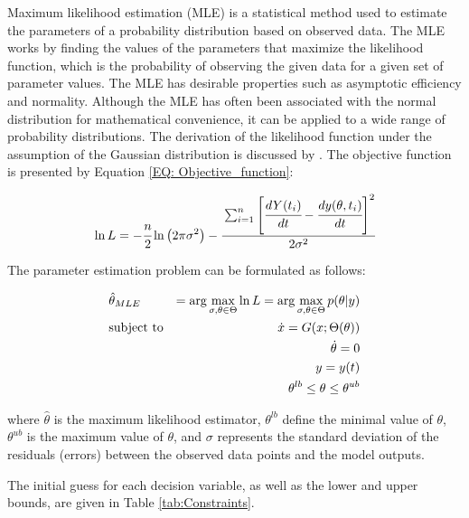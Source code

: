 \documentclass[../Article_Model_Parameters.tex]{subfiles}
\begin{document}
	Maximum likelihood estimation (MLE) is a statistical method used to estimate the parameters of a probability distribution based on observed data. The MLE works by finding the values of the parameters that maximize the likelihood function, which is the probability of observing the given data for a given set of parameter values. The MLE has desirable properties such as asymptotic efficiency and normality. Although the MLE has often been associated with the normal distribution for mathematical convenience, it can be applied to a wide range of probability distributions. The derivation of the likelihood function under the assumption of the Gaussian distribution is discussed by \citet{Himmelblau1970}. The objective function is presented by Equation \ref{EQ: Objective_function}:
	
	{\footnotesize
		\begin{equation} \label{EQ: Objective_function}
			\ln L = -\cfrac{n}{2}  \ln \left(2 \pi \sigma^2\right) 
			- \cfrac{ \sum_{i=1}^{n} \left[  \cfrac{d {Y}(t_i)}{dt} - \cfrac{dy(\theta, t_i)}{dt} \right]^2 }{2 \sigma^2}
		\end{equation}
	}
	
	The parameter estimation problem can be formulated as follows:
	
	{\footnotesize
		\begin{equation}
			\begin{aligned} \label{EQ: Optimization_formulation_MLE}
				&\hat{\theta}_{MLE} &= \arg \max_{\sigma, \theta \in \Theta} \ln L = \arg \max_{\sigma,\theta \in \Theta} p(\theta|y) \\
				&\text{subject to}
				& \dot{ x } = G({\color{black} x};\Theta(\theta)) \\
				&& \dot{\theta} = 0 \\
				&& y = y(t) \\
				&& \theta^{lb} \leq \theta \leq \theta^{ub}
			\end{aligned}
	\end{equation} } 
	
	where $\hat{\theta}$ is the maximum likelihood estimator, $\theta^{lb}$ define the minimal value of $\theta$, $\theta^{ub}$ is the maximum value of $\theta$, and $\sigma$ represents the standard deviation of the residuals (errors) between the observed data points and the model outputs.
	
	The initial guess for each decision variable, as well as the lower and upper bounds, are given in Table \ref{tab:Constraints}. 
	
\end{document}
